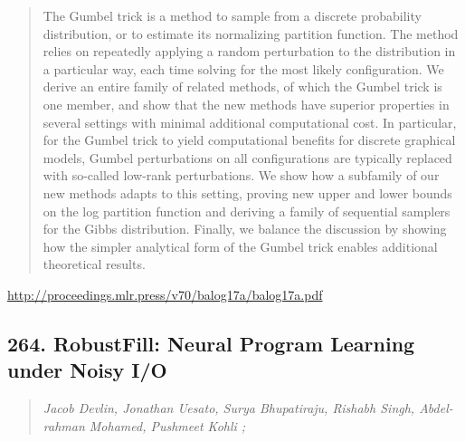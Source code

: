 \documentclass{article}
\begin{document}
\begin{quote}
    The Gumbel trick is a method to sample from a discrete probability distribution, or to estimate its normalizing partition function. The method relies on repeatedly applying a random perturbation to the distribution in a particular way, each time solving for the most likely configuration. We derive an entire family of related methods, of which the Gumbel trick is one member, and show that the new methods have superior properties in several settings with minimal additional computational cost. In particular, for the Gumbel trick to yield computational benefits for discrete graphical models, Gumbel perturbations on all configurations are typically replaced with so-called low-rank perturbations. We show how a subfamily of our new methods adapts to this setting, proving new upper and lower bounds on the log partition function and deriving a family of sequential samplers for the Gibbs distribution. Finally, we balance the discussion by showing how the simpler analytical form of the Gumbel trick enables additional theoretical results.  
\end{quote}

\href{http://proceedings.mlr.press/v70/balog17a/balog17a.pdf}{http://proceedings.mlr.press/v70/balog17a/balog17a.pdf}

\subsection{264. RobustFill: Neural Program Learning under Noisy I/O}

\begin{quote}
\footnotesize{\textit{Jacob Devlin, Jonathan Uesato, Surya Bhupatiraju, Rishabh Singh, Abdel-rahman Mohamed, Pushmeet Kohli ;}}

\end{quote}
\end{document}
